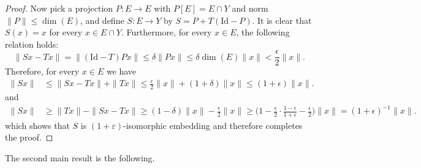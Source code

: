 \documentclass[11pt]{amsart}
\theoremstyle{definition}
\theoremstyle{remark}
\begin{document}
\begin{proof}
Now pick a projection $P:E\to E$ with $P[E]=E\cap Y$ and norm $\|P\|\leq \dim(E)$, and define 
$S:E\to Y$ by $S=P+T(\mathrm{Id}-P)$. It is clear that 
$S(x)=x$ for every $x\in E\cap Y$. Furthermore, for every $x\in E$, the following relation holds:
\[\|Sx-Tx\| = \|(\mathrm{Id}-T)Px\|\leq \delta\|Px\|\leq \delta\dim(E)\|x\|<\frac{\epsilon}{2}\|x\|.\]
Therefore, for every $x\in E$ we have
\begin{align*}\|Sx\|&\leq \|Sx-Tx\|+\|Tx\|\leq \frac{\epsilon}{2}\|x\|+(1+\delta)\|x\|\leq (1+\epsilon)\|x\|.
\end{align*}
and
\begin{align*}
\|Sx\|&\geq \|Tx\|-\|Sx-Tx\| \geq (1-\delta)\|x\|-\frac{\epsilon}{2}\|x\|\geq \Big(1-\frac{\epsilon}{2}\cdot \frac{1-\epsilon}{1+\epsilon}-\frac{\epsilon}{2}\Big)\|x\|=(1+\epsilon)^{-1}\|x\|.
\end{align*}
which shows that $S$ is $(1+\varepsilon)$-isomorphic embedding and therefore completes the proof.
\end{proof}

The second main result is the following.
\end{document}
